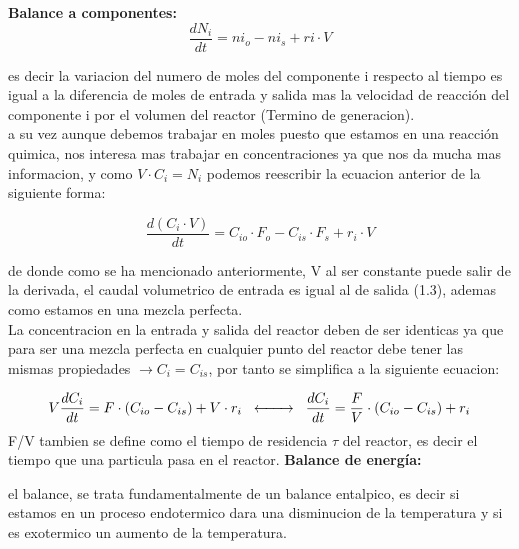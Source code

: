 \documentclass{report}
\begin{document}
\vspace{1\baselineskip}
\noindent \textbf{Balance a componentes:}
 \begin{equation}
	 \frac{dN_i}{dt}=ni_o-ni_s +ri \cdot V
 \end{equation}
\begin{flushleft}
\noindent es decir la variacion del numero de moles del componente i respecto al tiempo es igual a la diferencia de moles de entrada y salida mas la velocidad de reacción del componente i por el volumen del reactor (Termino de generacion).\\

 a su vez aunque debemos trabajar en moles puesto que estamos en una reacción quimica, nos interesa mas trabajar en concentraciones ya que nos da mucha mas informacion, y como
 $V\cdot C_i =N_i$ podemos reescribir la ecuacion anterior de la siguiente forma:

\end{flushleft}
 \begin{equation}
	 \frac{d(C_i\cdot V)}{dt}=C_{io}\cdot F_o-C_{is}\cdot F_s +r_i \cdot V
 \end{equation}
\begin{flushleft}

\noindent de donde como se ha mencionado anteriormente, V al ser constante puede salir de la derivada, el caudal volumetrico de entrada es igual al de salida (1.3), ademas como estamos en una mezcla perfecta.\\ 
La concentracion en la entrada y salida del reactor deben de ser identicas ya que para ser una mezcla perfecta en cualquier punto del reactor debe tener las mismas propiedades $\rightarrow C_i=C_{is}$, por tanto se simplifica a la siguiente ecuacion:

\end{flushleft}
 \begin{equation}
	V\frac{dC_i}{dt}=F\cdot (C_{io}-C_{is}) +V \cdot r_i \hspace{0.2cm}\xleftrightarrow{\;\qquad} \hspace{0.2cm}\frac{dC_i}{dt}=\frac{F}{V}\cdot (C_{io}-C_{is}) +r_i
 \end{equation}
 \noindent F/V tambien se define como el tiempo de residencia $\tau$ del reactor, es decir el tiempo que una particula pasa en el reactor.
\newpage
\vspace{1\baselineskip}
\noindent \textbf{Balance de energía:}
\begin{flushleft}
	\noindent el balance, se trata fundamentalmente de un balance entalpico, es decir si estamos en un proceso endotermico dara una disminucion de la temperatura y si es exotermico un aumento de la temperatura.\\
\end{flushleft}
\end{document}

